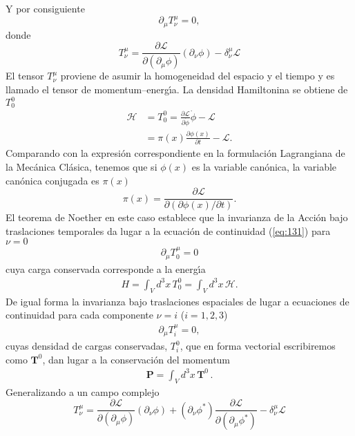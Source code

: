 Y por consiguiente
\begin{equation}
  \label{eq:131}
  \partial_\mu T^\mu_\nu=0,
\end{equation}
donde
\begin{equation}
  \label{eq:tmunu}
    T^\mu_\nu=\frac{\partial\mathcal{L}}{\partial(\partial_\mu\phi)}(\partial_\nu\phi)
      -\delta^\mu_\nu\mathcal{L}
\end{equation}
El tensor $T^\mu_\nu$ proviene de asumir la homogeneidad del espacio y el tiempo y es llamado el tensor de momentum--energ\'\i a. 
La densidad Hamiltonina se obtiene de $T^0_0$
\begin{align}
  \label{eq:3}
\mathcal{H}&=T^0_0=\frac{\partial\mathcal{L}}{\partial\dot{\phi}}\dot{\phi}
      -\mathcal{L}\\
      &=\pi(x)\frac{\partial\phi(x)}{\partial t}-\mathcal{L}.
\end{align}
Comparando con la expresi\'on correspondiente en la formulaci\'on
Lagrangiana de la Mec\'anica Cl\'asica, tenemos que si $\phi(x)$ es la
variable can\'onica, la variable can\'onica conjugada es $\pi(x)$
\begin{equation}
  \label{eq:4}
  \pi(x)=\frac{\partial\mathcal{L}}{\partial(\partial\phi(x)/\partial t)}.
\end{equation}
El teorema de Noether en este caso establece que la invarianza de la Acci\'on bajo traslaciones temporales da lugar a la ecuaci\'on de continuidad (\ref{eq:131}) para $\nu=0$
\begin{align}
\label{eq:122}
  \partial_\mu T^\mu_0=0
\end{align}
cuya carga conservada corresponde a la energ\'\i a
\begin{align}
  H=\int_V d^3x\, T^0_0=\int_V d^3x\,\mathcal{H}.
\end{align}
De igual forma la invarianza bajo traslaciones espaciales de lugar a ecuaciones de continuidad para cada componente $\nu=i$
 ($i=1,2,3$)
 \begin{align}
   \label{eq:235}
   \partial_\mu T^\mu_i=0,
 \end{align}
cuyas densidad de cargas conservadas, $T^0_i$, que en forma vectorial escribiremos como $\mathbf{T}^0$, dan lugar a la conservaci\'on del momentum
\begin{align}
  \mathbf{P}=\int_V d^3x\,\mathbf{T}^0\,.
\end{align}
Generalizando a un campo complejo
\begin{equation}
  \label{eq:138}
     T^\mu_\nu=\frac{\partial\mathcal{L}}{\partial(\partial_\mu\phi)}(\partial_\nu\phi)+(\partial_\nu\phi^*)\frac{\partial\mathcal{L}}{\partial(\partial_\mu\phi^*)}
      -\delta^\mu_\nu\mathcal{L}
\end{equation}

